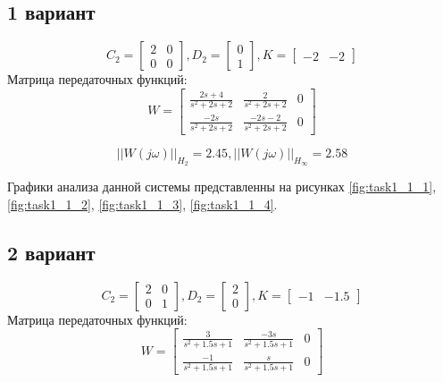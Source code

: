 \subsection{1 вариант}
\begin{equation*}
    C_2 = \begin{bmatrix}
        2 & 0 \\
        0 & 0
    \end{bmatrix}, 
    D_2 = \begin{bmatrix}
        0 \\ 1
    \end{bmatrix},
    K = \begin{bmatrix}
        -2 & -2
    \end{bmatrix}
\end{equation*}
Матрица передаточных функций:
\begin{equation*}
    W = 
    \begin{bmatrix}
        \frac{2s+4}{s^2+2s+2} & \frac{2}{s^2+2s+2} & 0 \\
        \frac{-2s}{s^2+2s+2} & \frac{-2s-2}{s^2+2s+2} & 0
    \end{bmatrix}
\end{equation*}

\begin{equation*}
    ||W(j\omega)||_{H_2} = 2.45, ||W(j\omega)||_{H_\infty} = 2.58
\end{equation*}

Графики анализа данной системы представленны на рисунках \ref{fig:task1_1_1}, \ref{fig:task1_1_2}, \ref{fig:task1_1_3}, \ref{fig:task1_1_4}.


\subsection{2 вариант}
\begin{equation*}
    C_2 = \begin{bmatrix}
        2 & 0 \\
        0 & 1
    \end{bmatrix}, 
    D_2 = \begin{bmatrix}
        2 \\ 0
    \end{bmatrix},
    K = \begin{bmatrix}
        -1 & -1.5
    \end{bmatrix}
\end{equation*}
Матрица передаточных функций:
\begin{equation*}
    W = 
    \begin{bmatrix}
        \frac{3}{s^2+1.5s+1} & \frac{-3s}{s^2+1.5s+1} & 0 \\
        \frac{-1}{s^2+1.5s+1} & \frac{s}{s^2+1.5s+1} & 0
    \end{bmatrix}
\end{equation*}

